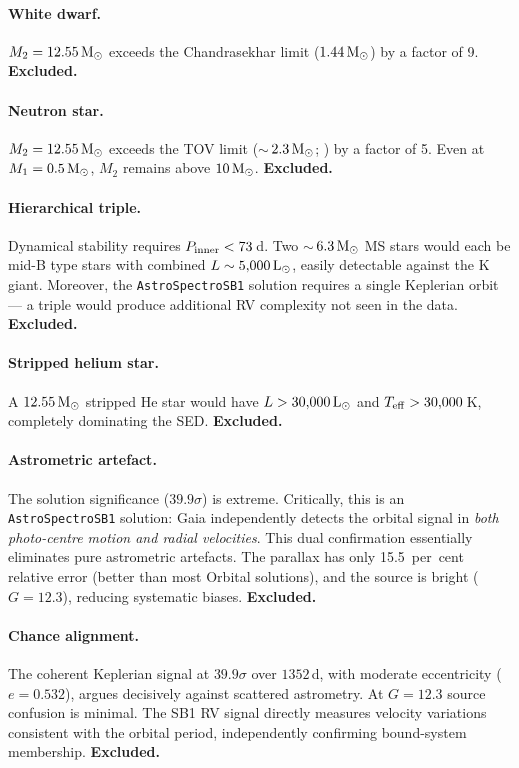 \documentclass[usenatbib,fleqn]{mnras}
\newcommand{\Msun}{{\rm M}_\odot}
\newcommand{\Lsun}{{\rm L}_\odot}
\begin{document}
\paragraph{White dwarf.}
$M_2 = 12.55\,\Msun$ exceeds the Chandrasekhar limit
($1.44\,\Msun$) by a factor of 9.  \textbf{Excluded.}

\paragraph{Neutron star.}
$M_2 = 12.55\,\Msun$ exceeds the TOV limit
($\sim$\,$2.3\,\Msun$; \citealt{Rezzolla2018}) by a factor of 5.
Even at $M_1 = 0.5\,\Msun$, $M_2$ remains above $10\,\Msun$.
\textbf{Excluded.}

\paragraph{Hierarchical triple.}
Dynamical stability \citep{MardlingAarseth2001} requires
$P_{\rm inner} < 73$\,d.  Two $\sim$\,$6.3\,\Msun$ MS stars
would each be mid-B type stars with combined
$L \sim 5{,}000\,\Lsun$, easily detectable against the K giant.
Moreover, the \texttt{AstroSpectroSB1} solution requires a single
Keplerian orbit --- a triple would produce additional RV
complexity not seen in the data.  \textbf{Excluded.}

\paragraph{Stripped helium star.}
A $12.55\,\Msun$ stripped He star would have
$L > 30{,}000\,\Lsun$ and $T_{\rm eff} > 30{,}000$\,K,
completely dominating the SED.  \textbf{Excluded.}

\paragraph{Astrometric artefact.}
The solution significance ($39.9\sigma$) is extreme.  Critically,
this is an \texttt{AstroSpectroSB1} solution: Gaia independently
detects the orbital signal in \emph{both photo-centre motion and
radial velocities}.  This dual confirmation essentially eliminates
pure astrometric artefacts.  The parallax has only 15.5~per~cent
relative error (better than most Orbital solutions), and the
source is bright ($G = 12.3$), reducing systematic biases.
\textbf{Excluded.}

\paragraph{Chance alignment.}
The coherent Keplerian signal at $39.9\sigma$ over $1352$\,d, with
moderate eccentricity ($e = 0.532$), argues decisively against
scattered astrometry.  At $G = 12.3$ source confusion is minimal.
The SB1 RV signal directly measures velocity variations consistent
with the orbital period, independently confirming bound-system
membership.  \textbf{Excluded.}
\end{document}
